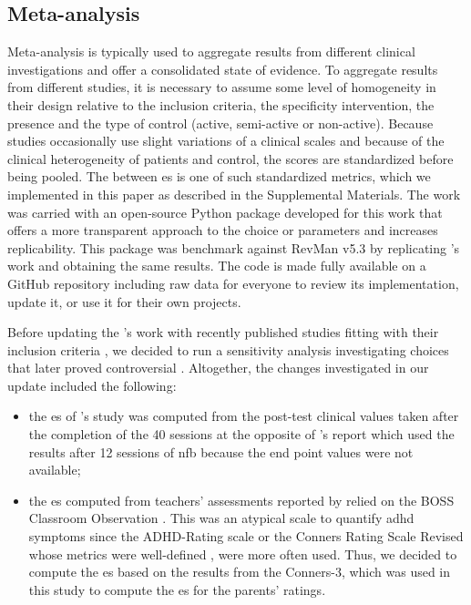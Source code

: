 \subsection{Meta-analysis}

Meta-analysis is typically used to aggregate results from different clinical investigations and offer a consolidated 
state of evidence. To aggregate results from different studies, it is necessary to assume some level of homogeneity 
in their design relative to the inclusion criteria, the specificity intervention, the presence and the type of control (active, semi-active or 
non-active). Because studies occasionally use slight variations of a clinical scales and because of the clinical heterogeneity of patients and control, 
the scores are standardized before being pooled. 
The between \gls{es} is one of such standardized metrics, which we implemented in this paper as described 
in the Supplemental Materials. The work was carried with an open-source 
Python package developed for this work that offers a more transparent approach to the choice or parameters 
and increases replicability. This package was benchmark against RevMan v5.3 \citep{RevMan}
by replicating \citet{Cortese2016}'s work and obtaining the same results. The code is made fully available 
on a GitHub repository \citep{Bussalb2018} including raw data for everyone to review its implementation, update it, or 
use it for their own projects. 
 
Before updating the \citet{Cortese2016}'s work with recently published studies fitting with their inclusion criteria 
\citep{Strehl2017, Baumeister2016}, we decided to run a sensitivity analysis investigating choices that later 
proved controversial \citep{Micoulaud2016}. Altogether, the changes investigated in our update included the following:
\begin{itemize}
\item the \gls{es} of \citeauthor{Arnold2014}'s study was computed from the post-test clinical values taken after the completion of the 40 sessions 
at the opposite of \citet{Cortese2016}'s report which used the results after 12 sessions of \gls{nfb} because the end point values were not available;
\item the \gls{es} computed from teachers' assessments reported by \citet{Steiner2014} relied on the BOSS Classroom Observation \citep{Shapiro2010}. This
was an atypical scale to quantify \gls{adhd} symptoms since the ADHD-Rating scale \citep{Pappas2006} or the Conners Rating Scale Revised \citep{Conners1998}
\citep{Christiansen2014, Bluschke2016} whose metrics were well-defined \citep{Collett2003, Epstein2012}, were more often used. Thus, we decided to compute
the \gls{es} based on the results from the Conners-3, which was used in this study to compute the \gls{es} for the parents' ratings.  
\end{itemize} 

